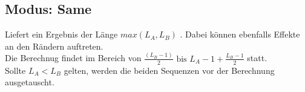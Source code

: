 \subsection{Modus: Same}
Liefert ein Ergebnis der Länge $ max(L_A, L_B) $ . Dabei können ebenfalls Effekte an den Rändern auftreten.\\
Die Berechnug findet im Bereich von $ \frac{(L_B - 1)}{2} \text{ bis } L_A - 1 + \frac{L_B - 1}{2} $ statt. \\
Sollte $ L_A < L_B $ gelten, werden die beiden Sequenzen vor der Berechnung ausgetauscht.










